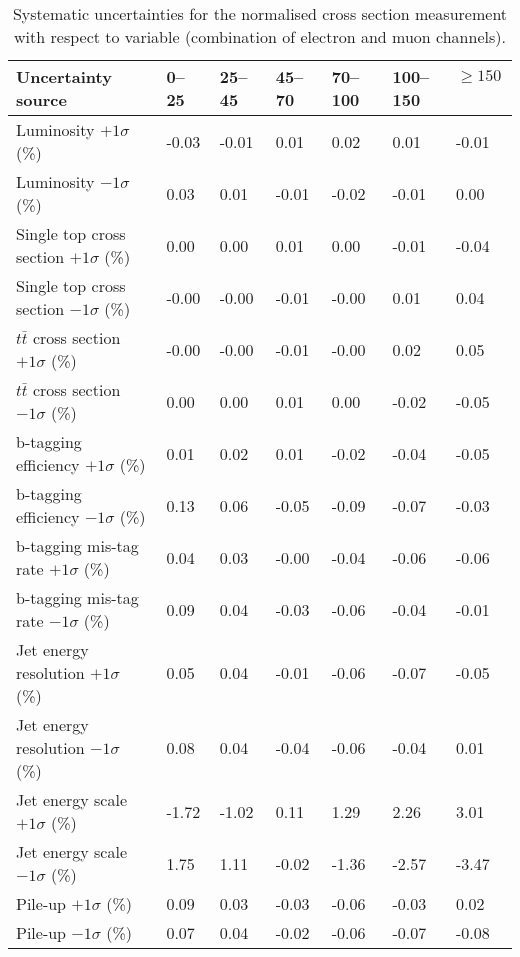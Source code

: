\begin{table}[htp]
	\centering
	\hspace*{-1cm}
	\caption{Systematic uncertainties for the normalised \ttbar cross section
	measurement with respect to \MET variable (combination of electron and muon channels).}
	\label{tab:combined_MET_systematics}
	\resizebox{\columnwidth}{!} {
	\begin{tabular}{l|l|l|l|l|l|l}
	\toprule
	Uncertainty source & 0--25~\GeV& 25--45~\GeV& 45--70~\GeV& 70--100~\GeV& 100--150~\GeV& $\geq 150$~\GeV \\
	\midrule
	Luminosity $+1\sigma$ (\%) & -0.03 & -0.01 & 0.01 & 0.02 & 0.01 & -0.01\\
	Luminosity $-1\sigma$ (\%) & 0.03 & 0.01 & -0.01 & -0.02 & -0.01 & 0.00\\
	\midrule
	Single top cross section $+1\sigma$ (\%) & 0.00 & 0.00 & 0.01 & 0.00 & -0.01 & -0.04\\
	Single top cross section $-1\sigma$ (\%) & -0.00 & -0.00 & -0.01 & -0.00 & 0.01 & 0.04\\
	$t\bar{t}$ cross section $+1\sigma$ (\%) & -0.00 & -0.00 & -0.01 & -0.00 & 0.02 & 0.05\\
	$t\bar{t}$ cross section $-1\sigma$ (\%) & 0.00 & 0.00 & 0.01 & 0.00 & -0.02 & -0.05\\
	\midrule
	b-tagging efficiency $+1\sigma$ (\%) & 0.01 & 0.02 & 0.01 & -0.02 & -0.04 & -0.05\\
	b-tagging efficiency $-1\sigma$ (\%) & 0.13 & 0.06 & -0.05 & -0.09 & -0.07 & -0.03\\
	\midrule
	b-tagging mis-tag rate $+1\sigma$ (\%) & 0.04 & 0.03 & -0.00 & -0.04 & -0.06 & -0.06\\
	b-tagging mis-tag rate $-1\sigma$ (\%) & 0.09 & 0.04 & -0.03 & -0.06 & -0.04 & -0.01\\
	\midrule
	Jet energy resolution $+1\sigma$ (\%) & 0.05 & 0.04 & -0.01 & -0.06 & -0.07 & -0.05\\
	Jet energy resolution $-1\sigma$ (\%) & 0.08 & 0.04 & -0.04 & -0.06 & -0.04 & 0.01\\
	\midrule
	Jet energy scale $+1\sigma$ (\%) & -1.72 & -1.02 & 0.11 & 1.29 & 2.26 & 3.01\\
	Jet energy scale $-1\sigma$ (\%) & 1.75 & 1.11 & -0.02 & -1.36 & -2.57 & -3.47\\
	\midrule
	Pile-up $+1\sigma$ (\%) & 0.09 & 0.03 & -0.03 & -0.06 & -0.03 & 0.02\\
	Pile-up $-1\sigma$ (\%) & 0.07 & 0.04 & -0.02 & -0.06 & -0.07 & -0.08\\

\end{tabular}}
\end{table}
